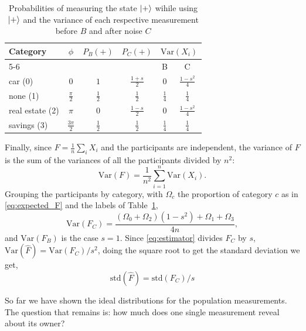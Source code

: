 \documentclass{ieeeaccess}
\begin{document}
\begin{table}[H]
  \caption{Probabilities of measuring the state $\ket{+}$ wihile using $\ket{+}$ and the variance of each respective measurement before $B$ and after noise $C$}
  \label{tab:collateral_probabilities}
  \centering
  \renewcommand{\arraystretch}{1.3}
  \begin{tabular}{lccccc}
    \toprule
    Category & $\phi$ & $P_B(+)$ & $P_C(+)$ & \multicolumn{2}{c}{$\mathrm{Var}(X_i)$} \\
    \cmidrule(l){5-6}
     & & & & B & C \\
    \midrule
    car (0)         & $0$                & $1$            & $\tfrac{1+s}{2}$ & $0$            & $\tfrac{1-s^2}{4}$ \\
    none (1)        & $\tfrac{\pi}{2}$   & $\tfrac{1}{2}$ & $\tfrac{1}{2}$   & $\tfrac{1}{4}$ & $\tfrac{1}{4}$ \\
    real estate (2) & $\pi$              & $0$            & $\tfrac{1-s}{2}$ & $0$            & $\tfrac{1-s^2}{4}$ \\
    savings (3)     & $\tfrac{3\pi}{2}$  & $\tfrac{1}{2}$ & $\tfrac{1}{2}$   & $\tfrac{1}{4}$ & $\tfrac{1}{4}$ \\
    \bottomrule
  \end{tabular}
\end{table}

Finally, since $F = \frac{1}{n}\sum_{i} X_i$ and the participants are independent, the variance of $F$ is the sum of the variances of all the participants divided by $n^2$:
\begin{equation}
  \mathrm{Var}(F) = \frac{1}{n^2}\sum_{i=1}^{n}\mathrm{Var}(X_i).
  \label{eq:var_F}
\end{equation}
Grouping the participants by category, with $\Omega_c$ the proportion of category $c$ as in \eqref{eq:expected_F} and the labels of Table~\ref{tab:collateral_probabilities},
\begin{equation}
  \mathrm{Var}(F_C) = \frac{(\Omega_0 + \Omega_2)(1 - s^2) + \Omega_1 + \Omega_3}{4n},
  \label{eq:var_fc}
\end{equation}
and $\mathrm{Var}(F_B)$ is the case $s = 1$. Since \eqref{eq:estimator} divides $F_C$ by $s$, $\mathrm{Var}(\hat{F}) = \mathrm{Var}(F_C)/s^2$, doing the square root to get the standard deviation we get,
\begin{equation}
  \mathrm{std}(\hat{F}) = \mathrm{std}(F_C)/s
  \label{eq:corrected_std}
\end{equation}


So far we have shown the ideal distributions for the population measurements. The question that remains is: how much does one single measurement reveal about its owner?
\end{document}
